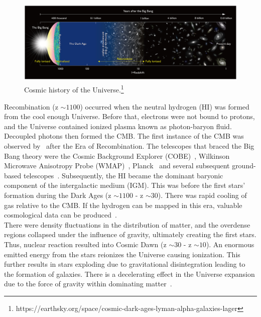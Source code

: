 \documentclass[12pt,a4paper]{report}
\begin{document}
	\begin{figure}[htb!]
		\begin{center}
			\includegraphics[width=\linewidth]{Figures/Reionizationtimeline.jpg}
			\caption{Cosmic history of the Universe.\protect\footnote{https://earthsky.org/space/cosmic-dark-ages-lyman-alpha-galaxies-lager}}
			\label{Fig:timeline}
		\end{center}
	\end{figure}
	
	Recombination (z $\sim1100$) occurred when the neutral hydrogen (HI) was formed from the cool enough Universe. Before that, electrons were not bound to protons, and the Universe contained ionized plasma known as photon-baryon fluid. Decoupled photons then formed the CMB. The first instance of the CMB was observed by~\citep{1965ApJ...142..419P} after the Era of Recombination. The telescopes that braced the Big Bang theory were the Cosmic Background Explorer (COBE)~\citep{2004astro.ph..2528M}, Wilkinson Microwave Anisotropy Probe (WMAP)~\citep{2009ApJS..180..306D}, Planck~\citep{2016A&A...594A..16P} and several subsequent ground-based telescopes~\citep{2004astro.ph..2528M}. Subsequently, the HI became the dominant baryonic component of the intergalactic medium (IGM). This was before the first stars' formation during the Dark Ages (z $\sim1100$ - z $\sim30$). There was rapid cooling of gas relative to the CMB. If the hydrogen can be mapped in this era, valuable cosmological data can be produced~\citep{2015Sci...349..849H, 11, 2004PhRvL..92u1301L}.\\
	
	There were density fluctuations in the distribution of matter, and the overdense regions collapsed under the influence of gravity, ultimately creating the first stars. Thus, nuclear reaction resulted into Cosmic Dawn (z $\sim30$ - z $\sim10$). An enormous emitted energy from the stars reionizes the Universe causing ionization. This further results in stars exploding due to gravitational disintegration leading to the formation of galaxies. There is a decelerating effect in the Universe expansion due to the force of gravity within dominating matter~\citep{2015Sci...349..849H, 2017arXiv170808521D, 2012AdSpR..49..433B}.\\
	
\end{document}
